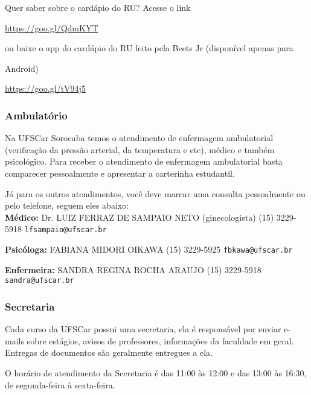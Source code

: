 Quer saber sobre o cardápio do RU? Acesse o link

\url{https://goo.gl/QdmKYT}

ou baixe o app do cardápio do RU feito pela Beets Jr (disponível apenas para

Android)

\url{https://goo.gl/tV94j5}

\subsubsection{Ambulatório}
Na UFSCar Sorocaba temos o atendimento de enfermagem ambulatorial (verificação da pressão arterial, da temperatura e etc), médico e também psicológico. Para receber o atendimento de enfermagem ambulatorial basta comparecer pessoalmente e apresentar a carterinha estudantil.

Já para os outros atendimentos, você deve marcar uma consulta pessoalmente ou pelo telefone, seguem eles abaixo: \\

\bigbreak
\noindent \textbf{Médico:}
\newline Dr. LUIZ FERRAZ DE SAMPAIO NETO (ginecologista)
\newline (15) 3229-5918
\newline \texttt{lfsampaio@ufscar.br}

\begin{multicols}{2}
\noindent \textbf{Psicóloga:}
  \newline FABIANA MIDORI OIKAWA
  \newline (15) 3229-5925
  \newline \texttt{fbkawa@ufscar.br}

\noindent \textbf{Enfermeira:}
  \newline SANDRA REGINA ROCHA ARAUJO
  \newline (15) 3229-5918
  \newline \texttt{sandra@ufscar.br}

\end{multicols}

\subsubsection{Secretaria}
Cada curso da UFSCar possui uma secretaria, ela é responsável por enviar e-mails sobre estágios, avisos de professores, informações da faculdade em geral. Entregas de documentos são geralmente entregues a ela.

O horário de atendimento da Secretaria é das 11:00 às 12:00 e das 13:00 às 16:30, de segunda-feira à sexta-feira.

